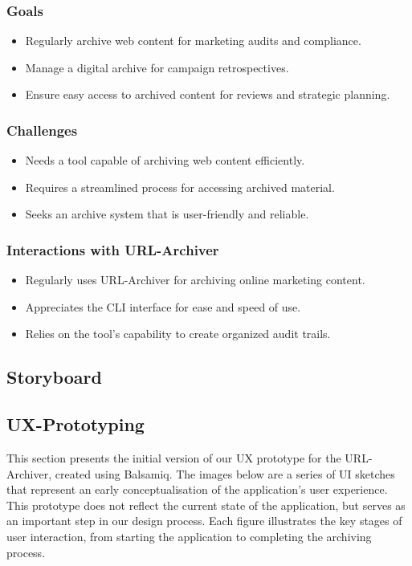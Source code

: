 \subsubsection{Goals}
\begin{itemize}
    \item Regularly archive web content for marketing audits and compliance.
    \item Manage a digital archive for campaign retrospectives.
    \item Ensure easy access to archived content for reviews and strategic planning.
\end{itemize}

\subsubsection{Challenges}
\begin{itemize}
    \item Needs a tool capable of archiving web content efficiently.
    \item Requires a streamlined process for accessing archived material.
    \item Seeks an archive system that is user-friendly and reliable.
\end{itemize}

\subsubsection{Interactions with URL-Archiver}
\begin{itemize}
    \item Regularly uses URL-Archiver for archiving online marketing content.
    \item Appreciates the CLI interface for ease and speed of use.
    \item Relies on the tool's capability to create organized audit trails.
\end{itemize}


\subsection{Storyboard}


\subsection{UX-Prototyping}
This section presents the initial version of our UX prototype for the URL-Archiver, created using Balsamiq.
The images below are a series of UI sketches that represent an early conceptualisation of the application's user experience.
This prototype does not reflect the current state of the application, but serves as an important step in our design process.
Each figure illustrates the key stages of user interaction, from starting the application to completing the archiving process.

